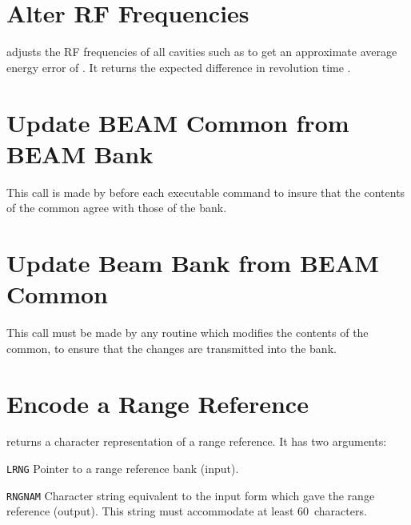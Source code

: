 \section{Alter RF Frequencies}
\label{ENFREQ}
adjusts the RF frequencies of all cavities such as to get an
approximate average energy error of .
It returns the expected difference in revolution time .

\section{Update BEAM Common from BEAM Bank}
\label{ENGET}
This call is made by  before each executable command
to insure that the contents of the  common agree with
those of the  bank.

\section{Update Beam Bank from BEAM Common}
\label{ENPUT}
This call must be made by any routine which modifies the contents
of the  common, to ensure that the changes are
transmitted into the  bank.

\section{Encode a Range Reference}
\label{ENRANG}
returns a character representation of a range reference.
It has two arguments:
\begin{mylist}
\item[\tt LRNG]
Pointer to a range reference bank (input).
\item[\tt RNGNAM]
Character string equivalent to the input form which gave the range
reference (output).
This string must accommodate at least 60~characters.
\end{mylist}

